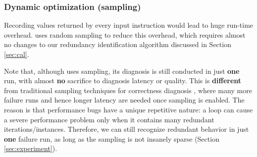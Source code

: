 
\subsubsection{Dynamic optimization (sampling)}
\label{sec:inst}


Recording values returned by every input instruction would lead to 
huge run-time overhead.
\Tool uses random sampling to reduce this overhead, which 
requires almost no changes to our redundancy 
identification algorithm discussed in Section \ref{sec:cal}.

Note that, although \Tool uses sampling, its diagnosis is still conducted
in just \textbf{one} run, with almost \textbf{no}
sacrifice to diagnosis latency or quality. This is
\textbf{different} from traditional sampling techniques
for correctness diagnosis \cite{liblit03,liblit05}, where
many more failure runs and hence longer latency
are needed once sampling is enabled.
The reason is that performance bugs have a unique repetitive nature:
a loop can cause a severe performance problem only when it 
contains many redundant iterations/instances.
Therefore, we can still recognize redundant behavior in just
\textbf{one} failure run, 
as long as the sampling is not insanely sparse
(Section \ref{sec:experiment}). 

